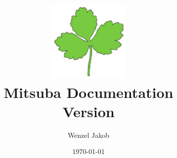 \documentclass[footinclude=false,11pt,DIV11]{scrartcl}
\title{
	\vspace{3cm}
	\includegraphics[width=4cm]{images/logo_plain.pdf}\\\vspace{1.5cm}
	\Huge
	Mitsuba Documentation\\\vspace{4mm}
	\LARGE Version \MitsubaVersion
	\vspace{5mm}
}
\author{Wenzel Jakob}
\date{\today}
\begin{document}
\maketitle
\clearpage
\ofoot[\pagemark]{\pagemark}

\tableofcontents
















\end{document}
